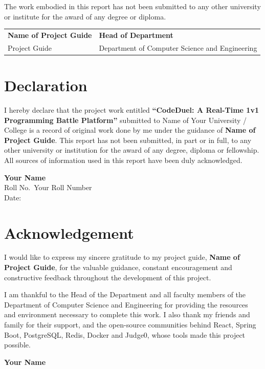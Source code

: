 \documentclass[12pt,a4paper,oneside]{report}
\newcommand{\projecttitle}{CodeDuel: A Real-Time 1v1 Programming Battle Platform}
\newcommand{\studentname}{Your Name}
\newcommand{\rollno}{Your Roll Number}
\newcommand{\guidename}{Name of Project Guide}
\newcommand{\department}{Department of Computer Science and Engineering}
\newcommand{\university}{Name of Your University / College}
\begin{document}
The work embodied in this report has not been submitted to any other university or institute for the award
of any degree or diploma.

\vspace{3cm}
\begin{tabular}{p{7cm}p{7cm}}
\textbf{\guidename} & \textbf{Head of Department}\\
Project Guide & \department\\
\end{tabular}

\chapter*{Declaration}
I hereby declare that the project work entitled \textbf{``\projecttitle''} submitted to \university{} is a
record of original work done by me under the guidance of \textbf{\guidename}. This report has not been
submitted, in part or in full, to any other university or institution for the award of any degree, diploma
or fellowship. All sources of information used in this report have been duly acknowledged.

\vspace{2.5cm}
\begin{flushright}
\textbf{\studentname}\\ Roll No.\ \rollno\\ Date: \hspace{2cm}
\end{flushright}

\chapter*{Acknowledgement}
I would like to express my sincere gratitude to my project guide, \textbf{\guidename}, for the valuable
guidance, constant encouragement and constructive feedback throughout the development of this project.

I am thankful to the Head of the Department and all faculty members of the \department{} for providing the
resources and environment necessary to complete this work. I also thank my friends and family for their
support, and the open-source communities behind React, Spring Boot, PostgreSQL, Redis, Docker and Judge0,
whose tools made this project possible.

\begin{flushright}\textbf{\studentname}\end{flushright}
\end{document}
